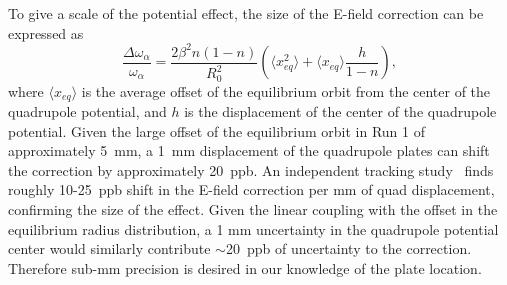 To give a scale of the potential effect, the size of the E-field correction can be expressed as~\cite{Fienberg:thesis}
\begin{equation} \label{eq:Dwa_Wa}
\frac{\Delta\omega_{\alpha}}{\omega_{\alpha}} = \frac{2 \beta^2 n (1-n)}{R_0^2} (\langle x_{eq}^2 \rangle + \langle x_{eq} \rangle \frac{h}{1-n}) ,
\end{equation}
where $\langle x_{eq} \rangle$ is the average offset of the equilibrium orbit from the center of the quadrupole potential, and $h$ is the displacement of the center of the quadrupole potential.
Given the large offset of the equilibrium orbit in Run 1 of approximately \SI{5}{mm}, a \SI{1}{mm} displacement of the quadrupole plates can shift the correction by approximately \SI{20}{ppb}.
An independent tracking study~\cite{Zhanibek:doc13939} finds roughly 10-\SI{25}{ppb} shift in the E-field correction per mm of quad displacement, confirming the size of the effect.
Given the linear coupling with the offset in the equilibrium radius distribution, a 1 mm uncertainty in the quadrupole potential center would similarly contribute $\sim$\SI{20}{ppb} of uncertainty to the correction.
Therefore sub-mm precision is desired in our knowledge of the plate location.








